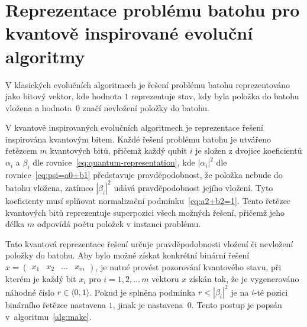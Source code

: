 \section{Reprezentace problému batohu pro kvantově inspirované evoluční algoritmy}
V klasických evolučních algoritmech je řešení problému batohu reprezentováno jako bitový vektor, kde hodnota $1$ reprezentuje stav, kdy byla položka do batohu vložena a hodnota~$0$ značí nevložení položky do batohu.

V kvantově inspirovaných evolučních algoritmech je reprezentace řešení inspirována kvantovým bitem. 
Každé řešení problému batohu je utvářeno řetězcem $m$ kvantových bitů, přičemž každý qubit $i$ je složen z dvojice koeficientů $\alpha_i$ a $\beta_i$ dle rovnice~\ref{eq:quantum-representation}, kde $\left| \alpha_i \right|^2$ dle rovnice~\ref{eq:psi=a0+b1} představuje pravděpodobnost, že položka nebude do batohu vložena, zatímco $\left| \beta_i \right|^2$ udává pravděpodobnost jejího vložení. 
Tyto koeficienty musí splňovat normalizační podmínku~\ref{eq:a2+b2=1}.
Tento řetězec kvantových bitů reprezentuje superpozici všech možných řešení, přičemž jeho délka $m$ odpovídá počtu položek v instanci problému.

Tato kvantová reprezentace řešení určuje pravděpodobnosti vložení či nevložení položky do batohu. 
Aby bylo možné získat konkrétní binární řešení $x = \begin{pmatrix} x_1 & x_2 & \dots & x_m \end{pmatrix}$, je nutné provést pozorování kvantového stavu, při kterém je každý bit $x_i$ pro $i = 1,2,\dots\,m$ vektoru $x$ získán tak, že je vygenerováno náhodné číslo $r \in \langle 0, 1 \rangle$. 
Pokud je splněna podmínka $r < \left| \beta_i \right|^2$ je na $i$-té pozici binárního řetězce nastavena $1$, jinak je nastavena~$0$. 
Tento postup je popsán v~algoritmu~\ref{alg:make}.

